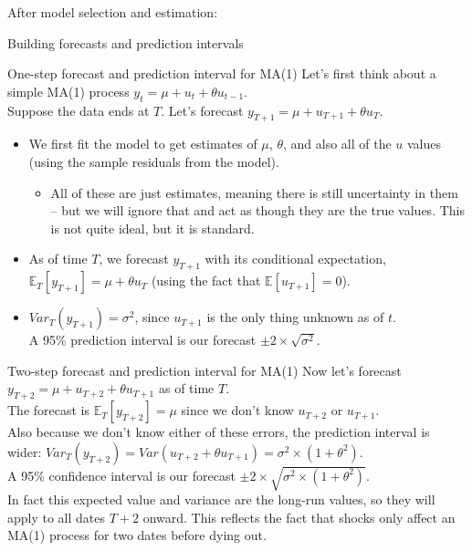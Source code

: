 \documentclass[t,12pt]{beamer}
\begin{document}
\begin{frame}[c]
\vfill
\centerline{After model selection and estimation:}
\centerline{Building forecasts and prediction intervals}
\vfill
\end{frame}

\begin{frame}[c]{One-step forecast and prediction interval for MA(1)}
Let's first think about a simple MA(1) process $y_t = \mu + u_t + \theta u_{t-1}$.
\\ \smallskip
Suppose the data ends at $T$. Let's forecast $y_{T+1} = \mu + u_{T+1} + \theta u_T$.
\begin{itemize}
\smallskip
\item We first fit the model to get estimates of $\mu$, $\theta$, and also all of the $u$ values (using the sample residuals from the model).
\begin{itemize}
\smallskip
\item All of these are just estimates, meaning there is still uncertainty in them -- but we will ignore that and act as though they are the true values. This is not quite ideal, but it is standard.
\end{itemize}
\smallskip
\item As of time $T$, we forecast $y_{T+1}$ with its conditional expectation,
\\ $\mathbb{E}_T[y_{T+1}] = \mu + \theta u_T$ (using the fact that $\mathbb{E}[u_{T+1}]=0$).
\medskip
\item $Var_T(y_{T+1}) = \sigma^2$, since $u_{T+1}$ is the only thing unknown as of $t$.
\\ A 95\% prediction interval is our forecast $\pm 2 \times \sqrt{\sigma^2}$.
\end{itemize}
\end{frame}

\begin{frame}[c]{Two-step forecast and prediction interval for MA(1)}
Now let's forecast $y_{T+2} = \mu + u_{T+2} + \theta u_{T+1}$ as of time $T$.
\\ \bigskip
The forecast is $\mathbb{E}_T[y_{T+2}] = \mu$ since we don't know $u_{T+2}$ or $u_{T+1}$.
\\ \bigskip
Also because we don't know either of these errors, the prediction interval is wider:
$Var_T(y_{T+2}) = Var(u_{T+2} + \theta u_{T+1}) = \sigma^2\times(1+\theta^2)$.
\\ \bigskip
A 95\% confidence interval is our forecast $\pm 2 \times\sqrt{ \sigma^2\times(1+\theta^2) }$.
\\ \bigskip
In fact this expected value and variance are the long-run values, 
so they will apply to all dates $T+2$ onward.
This reflects the fact that shocks only affect an MA(1) process for two dates before dying out.
\end{frame}
\end{document}
